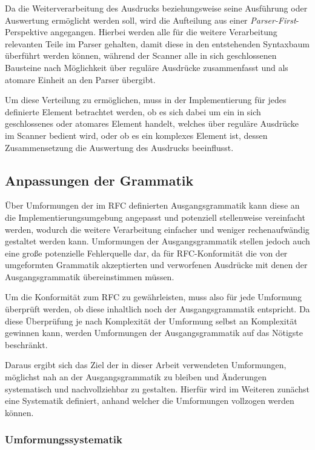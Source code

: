 \documentclass[oneside]{ausarbeitung}
\begin{document}
\pagebreak

Da die Weiterverarbeitung des Ausdrucks beziehungsweise seine Ausführung oder Auswertung ermöglicht werden soll, wird die Aufteilung aus einer \textit{Parser-First}-Perspektive angegangen. Hierbei werden alle für die weitere Verarbeitung relevanten Teile im Parser gehalten, damit diese in den entstehenden Syntaxbaum überführt werden können, während der Scanner alle in sich geschlossenen Bausteine nach Möglichkeit über reguläre Ausdrücke zusammenfasst und als atomare Einheit an den Parser übergibt.
	
Um diese Verteilung zu ermöglichen, muss in der Implementierung für jedes definierte Element betrachtet werden, ob es sich dabei um ein in sich geschlossenes oder atomares Element handelt, welches über reguläre Ausdrücke im Scanner bedient wird, oder ob es ein komplexes Element ist, dessen Zusammensetzung die Auswertung des Ausdrucks beeinflusst.
		
	
	
\subsection{Anpassungen der Grammatik}
\label{sec:anpassungen}
	
Über Umformungen der im RFC definierten Ausgangsgrammatik kann diese an die Implementierungsumgebung angepasst und potenziell stellenweise vereinfacht werden, wodurch die weitere Verarbeitung einfacher und weniger rechenaufwändig gestaltet werden kann. Umformungen der Ausgangsgrammatik stellen jedoch auch eine große potenzielle Fehlerquelle dar, da für RFC-Konformität die von der umgeformten Grammatik akzeptierten und verworfenen Ausdrücke mit denen der Ausgangsgrammatik übereinstimmen müssen.
	
Um die Konformität zum RFC zu gewährleisten, muss also für jede Umformung überprüft werden, ob diese inhaltlich noch der Ausgangsgrammatik entspricht. Da diese Überprüfung je nach Komplexität der Umformung selbst an Komplexität gewinnen kann, werden Umformungen der Ausgangsgrammatik auf das Nötigste beschränkt. 
	
Daraus ergibt sich das Ziel der in dieser Arbeit verwendeten Umformungen, möglichst nah an der Ausgangsgrammatik zu bleiben und Änderungen systematisch und nachvollziehbar zu gestalten. Hierfür wird im Weiteren zunächst eine Systematik definiert, anhand welcher die Umformungen vollzogen werden können.

\pagebreak

\subsubsection{Umformungssystematik}
	
\end{document}
